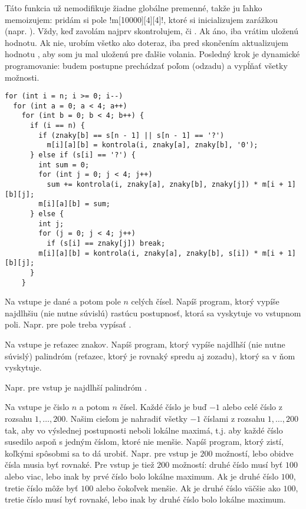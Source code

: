 Táto funkcia už nemodifikuje žiadne globálne premenné, takže ju ľahko memoizujem: pridám
si pole \prg!m[10000][4][4]!, ktoré si inicializujem zarážkou (napr. ).
Vždy, keď zavolám  najprv skontrolujem, či . Ak áno,
iba vrátim uloženú hodnotu. Ak nie, urobím všetko ako doteraz, iba pred skončením aktualizujem
hodnotu , aby som ju mal uloženú pre ďalšie volania.
Posledný krok je dynamické programovanie: budem postupne prechádzať poľom  (odzadu)
a vypĺňať všetky možnosti.

\begin{lstlisting}
for (int i = n; i >= 0; i--)
  for (int a = 0; a < 4; a++)
    for (int b = 0; b < 4; b++) {
      if (i == n) {
        if (znaky[b] == s[n - 1] || s[n - 1] == '?')
          m[i][a][b] = kontrola(i, znaky[a], znaky[b], '0');
      } else if (s[i] == '?') {
        int sum = 0;
        for (int j = 0; j < 4; j++)
          sum += kontrola(i, znaky[a], znaky[b], znaky[j]) * m[i + 1][b][j];
        m[i][a][b] = sum;
      } else {
        int j;
        for (j = 0; j < 4; j++)
          if (s[i] == znaky[j]) break;
        m[i][a][b] = kontrola(i, znaky[a], znaky[b], s[i]) * m[i + 1][b][j];
      }
    }
\end{lstlisting}



\begin{uloha}
  Na vstupe je dané  a potom pole $n$ celých čísel.
  Napíš program, ktorý vypíše najdlhšiu (nie nutne súvislú) rastúcu 
  postupnosť, ktorá sa vyskytuje vo vstupnom poli. 
  Napr. pre pole  
  treba vypísať .
\end{uloha}


\begin{uloha}
  Na vstupe je reťazec znakov. Napíš program, ktorý vypíše 
  najdlhší (nie nutne súvislý) palindróm (reťazec, ktorý je rovnaký spredu aj zozadu),
  ktorý sa v ňom vyskytuje. 

  Napr. pre vstup
  \hbox{}
  je najdlhší palindróm .
\end{uloha}

\begin{uloha}
  Na vstupe je čislo $n$ a potom $n$ čísel. Každé číslo je buď $-1$ alebo celé
  číslo z rozsahu $1,\ldots,200$. Našim cieľom je nahradiť všetky $-1$
  číslami z rozsahu $1,\ldots,200$ tak, aby vo výslednej postupnosti neboli
  lokálne maximá, t.j. aby každé číslo susedilo aspoň s jedným číslom, ktoré nie
  menšie. Napíš program, ktorý zistí, koľkými spôsobmi sa to dá urobiť.
  Napr. pre vstup  je $200$ možností, lebo obidve čísla musia byť
  rovnaké. Pre vstup  je tiež $200$ možností: druhé číslo musí byť
  $100$ alebo viac, lebo inak by prvé číslo bolo lokálne maximum. Ak je druhé
  číslo $100$, tretie číslo môže byť $100$ alebo čokoľvek menšie. Ak je druhé
  číslo väčšie ako $100$, tretie číslo musí byť rovnaké, lebo inak by druhé
  číslo bolo lokálne maximum.
\end{uloha}

